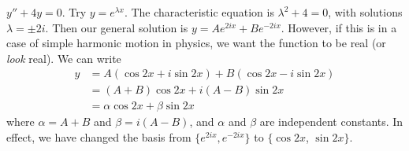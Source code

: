 \documentclass[a4paper]{article}
\begin{document}
\begin{eg}
  $y'' + 4y = 0$. Try $y = e^{\lambda x}$. The characteristic equation is $\lambda^2 + 4 = 0$, with solutions $\lambda = \pm 2i$. Then our general solution is $y = Ae^{2ix} + Be^{-2ix}$. However, if this is in a case of simple harmonic motion in physics, we want the function to be real (or \emph{look} real). We can write
  \begin{align*}
    y &= A(\cos 2x + i\sin 2x) + B(\cos 2x - i\sin 2x)\\
    &= (A + B)\cos 2x + i(A - B)\sin 2x\\
    &= \alpha\cos 2x + \beta\sin 2x
  \end{align*}
where $\alpha = A + B$ and $\beta = i(A - B)$, and $\alpha$ and $\beta$ are independent constants.
\note In effect, we have changed the basis from $\{e^{2ix}, e^{-2ix}\}$ to $\{\cos 2x$, $\sin 2x\}$.
\end{eg}
\end{document}
